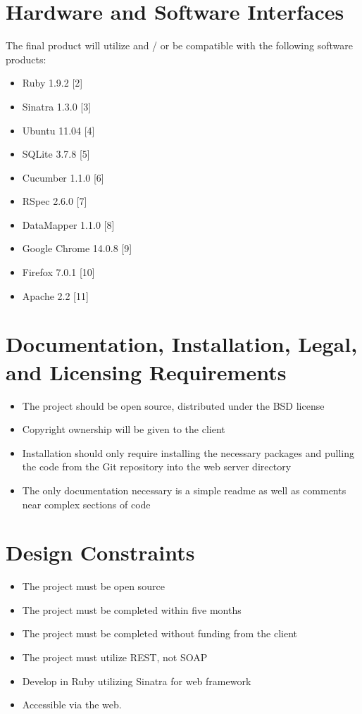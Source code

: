 \documentclass{article}
\begin{document}
\section{Hardware and Software Interfaces}
The final product will utilize and / or be compatible with the following software products:\\
\begin{itemize}
\item Ruby 1.9.2 [2]
\item Sinatra 1.3.0 [3]
\item Ubuntu 11.04 [4]
\item SQLite 3.7.8 [5]
\item Cucumber 1.1.0 [6]
\item RSpec 2.6.0 [7]
\item DataMapper 1.1.0 [8]
\item Google Chrome 14.0.8 [9]
\item Firefox 7.0.1 [10]
\item Apache 2.2 [11]
\end{itemize}

\section{Documentation, Installation, Legal, and Licensing Requirements}
\begin{itemize}
\item The project should be open source, distributed under the BSD license
\item Copyright ownership will be given to the client
\item Installation should only require installing the necessary packages and pulling the code from the Git repository into the web server directory
\item The only documentation necessary is a simple readme as well as comments near complex sections of code
\end{itemize}

\section{Design Constraints}
\begin{itemize}
\item The project must be open source
\item The project must be completed within five months
\item The project must be completed without funding from the client
\item The project must utilize REST, not SOAP\label{soap}
\item Develop in Ruby utilizing Sinatra for web framework
\item Accessible via the web.
\end{itemize} 
\end{document}

